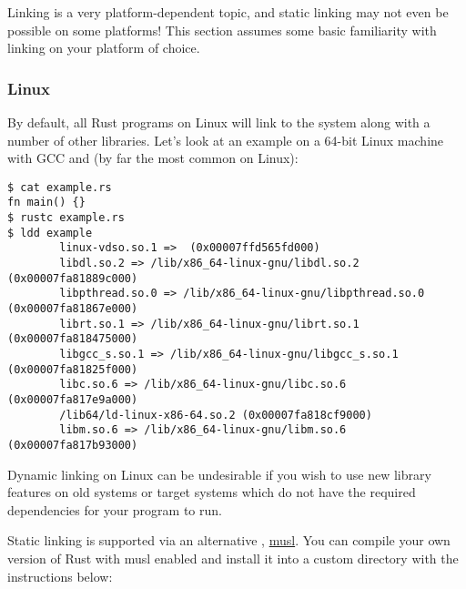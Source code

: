 \blank

Linking is a very platform-dependent topic, and static linking may not even be possible on some platforms! This section assumes 
some basic familiarity with linking on your platform of choice.

\subsubsection*{Linux}

By default, all Rust programs on Linux will link to the system  along with a number of other libraries. Let's look 
at an example on a 64-bit Linux machine with GCC and  (by far the most common  on Linux):

\begin{verbatim}
$ cat example.rs
fn main() {}
$ rustc example.rs
$ ldd example
        linux-vdso.so.1 =>  (0x00007ffd565fd000)
        libdl.so.2 => /lib/x86_64-linux-gnu/libdl.so.2 (0x00007fa81889c000)
        libpthread.so.0 => /lib/x86_64-linux-gnu/libpthread.so.0 (0x00007fa81867e000)
        librt.so.1 => /lib/x86_64-linux-gnu/librt.so.1 (0x00007fa818475000)
        libgcc_s.so.1 => /lib/x86_64-linux-gnu/libgcc_s.so.1 (0x00007fa81825f000)
        libc.so.6 => /lib/x86_64-linux-gnu/libc.so.6 (0x00007fa817e9a000)
        /lib64/ld-linux-x86-64.so.2 (0x00007fa818cf9000)
        libm.so.6 => /lib/x86_64-linux-gnu/libm.so.6 (0x00007fa817b93000)
\end{verbatim}

Dynamic linking on Linux can be undesirable if you wish to use new library features on old systems or target systems which 
do not have the required dependencies for your program to run.

\blank

Static linking is supported via an alternative , \href{http://www.musl-libc.org/}{musl}. You can compile your own 
version of Rust with musl enabled and install it into a custom directory with the instructions below:

